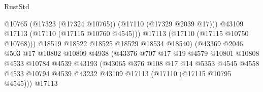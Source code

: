 \begin{lexlean}{RustStd}
\begin{coremodule}
                                                  @10765
                                                  (@17323 (@17324 @10765))
                                                  (@17110 (@17329 @2039 @17)))
                                                @43109
                                                @17113
                                                (@17110 (@17115 @10760 @4545)))
                                              @17113
                                              (@17110 (@17115 @10750 @10768)))
                                            @18519
                                            @18522
                                            @18525
                                            @18529
                                            @18534
                                            @18540)
                                          (@43369
                                            @2046
                                            @503
                                            @17
                                            @10802
                                            @10809
                                            @4938
                                            (@43376
                                              @707
                                              @17
                                              @19
                                              @4579
                                              @10801
                                              @10808
                                              @4533
                                              @10784
                                              @4539
                                              @43193
                                              (@43065
                                                @376
                                                @108
                                                @17
                                                @14
                                                @5353
                                                @4545
                                                @4558
                                                @4533
                                                @10794
                                                @4539
                                                @43232
                                                @43109
                                                @17113
                                                (@17110 (@17115 @10795 @4545)))
                                              @17113

\end{coremodule}
\end{lexlean}
